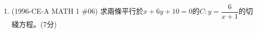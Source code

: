 \documentclass[12pt]{article}
\begin{document}
\begin{enumerate}
            \hrulefill
            
            \hrulefill
            
            \hrulefill
            
            \hrulefill
            
            \hrulefill
            
            \hrulefill
            
            \hrulefill
            
            \hrulefill
            
            \hrulefill
            
            \hrulefill
            
            \hrulefill
            
            \hrulefill

        \pagebreak
        \item (1996-CE-A MATH 1 \#06) 求兩條平行於$x+6y+10=0$的$C:y=\dfrac{6}{x+1}$的切綫方程。\hfill(7分)
        
        \hrulefill
            
            \hrulefill
            
            \hrulefill
            
            \hrulefill
            
            \hrulefill
            
            \hrulefill
            
            \hrulefill
            
            \hrulefill
            
            \hrulefill
            
            \hrulefill
            
            \hrulefill
            
            \hrulefill
            
            \hrulefill
            
            \hrulefill

            \hrulefill
            
            \hrulefill
            
            \hrulefill
            
            \hrulefill
            
            \hrulefill
            
            \hrulefill
            

\end{enumerate}
\end{document}
